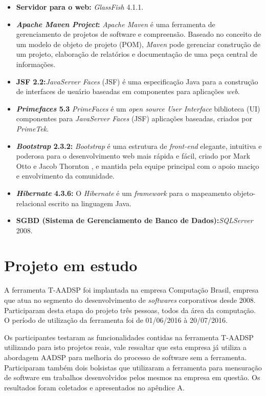 \documentclass{acm_proc_article-sp}
\begin{document}
\begin{itemize}
\item \textbf{Servidor para o web:} \textit{GlassFish} 4.1.1. 
\item \textbf{\textit{Apache Maven Project}:} \textit{Apache Maven} é uma ferramenta de gerenciamento de projetos de software e compreensão. Baseado no conceito de um modelo de objeto de projeto (POM), \textit{Maven} pode gerenciar construção de um projeto, elaboração de relatórios e documentação de uma peça central de informações.
\item \textbf{JSF 2.2:}\textit{JavaServer Faces} (JSF) é uma especificação Java para a construção de interfaces de usuário baseadas em componentes para aplicações \textit{web}.
\item \textbf{\textit{Primefaces} 5.3} \textit{PrimeFaces} é um \textit{open source User Interface} biblioteca (UI) componentes para \textit{JavaServer Faces} (JSF) aplicações baseadas, criados por \textit{PrimeTek}.  
\item \textbf{\textit{Bootstrap} 2.3.2:} \textit{Bootstrap} é uma estrutura de \textit{front-end} elegante, intuitiva e poderosa para o desenvolvimento web mais rápida e fácil, criado por Mark Otto e Jacob Thornton , e mantida pela equipe principal com o apoio maciço e envolvimento da comunidade. 
\item \textbf{\textit{Hibernate} 4.3.6:} O \textit{Hibernate} é um \textit{framework} para o mapeamento objeto-relacional escrito na linguagem Java. 
\item \textbf{SGBD (Sistema de Gerenciamento de Banco de Dados):}\textit{SQLServer} 2008. 
\end{itemize}


\section{Projeto em estudo}
A ferramenta T-AADSP foi implantada na empresa Computação Brasil, empresa que atua no segmento do desenvolvimento de \textit{softwares} corporativos desde 2008. Participaram desta etapa do projeto três pessoas, todos da área da computação. O período de utilização da ferramenta foi de 01/06/2016 à 20/07/2016. 

Os participantes testaram as funcionalidades contidas na ferramenta T-AADSP utilizando para isto projetos reais, vale ressaltar que esta empresa já utiliza a abordagem AADSP para melhoria do processo de software sem a ferramenta. Participaram também dois bolsistas que utilizaram a ferramenta para mensuração de software em trabalhos desenvolvidos pelos mesmos na empresa em questão. Os resultados foram coletados e apresentados no apêndice A.
\end{document}
